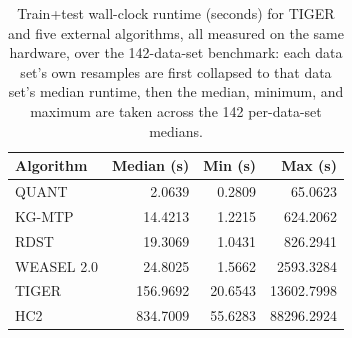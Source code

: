 \begin{table}[t]
\centering
\begin{tabular}{lrrr}
\toprule
Algorithm & Median (s) & Min (s) & Max (s) \\
\midrule
QUANT & 2.0639 & 0.2809 & 65.0623 \\
KG-MTP & 14.4213 & 1.2215 & 624.2062 \\
RDST & 19.3069 & 1.0431 & 826.2941 \\
WEASEL 2.0 & 24.8025 & 1.5662 & 2593.3284 \\
TIGER & 156.9692 & 20.6543 & 13602.7998 \\
HC2 & 834.7009 & 55.6283 & 88296.2924 \\
\bottomrule
\end{tabular}
\caption{Train+test wall-clock runtime (seconds) for TIGER and five external algorithms, all measured on the same hardware, over the 142-data-set benchmark: each data set's own resamples are first collapsed to that data set's median runtime, then the median, minimum, and maximum are taken across the 142 per-data-set medians.}
\label{tab:runtimes}
\end{table}
